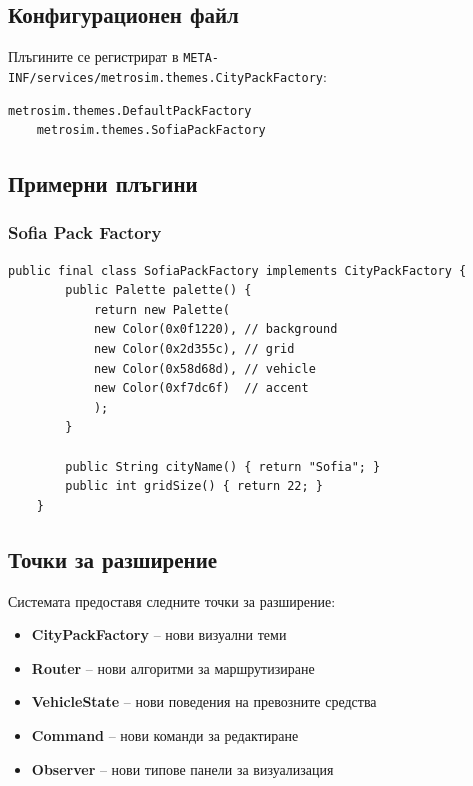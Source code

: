 \documentclass{article}
\begin{document}
\subsection{Конфигурационен файл}

Плъгините се регистрират в \texttt{META-INF/services/metrosim.themes.CityPackFactory}:

\begin{lstlisting}[caption=Регистрация на плъгини]
	metrosim.themes.DefaultPackFactory
	metrosim.themes.SofiaPackFactory
\end{lstlisting}

\subsection{Примерни плъгини}

\subsubsection{Sofia Pack Factory}

\begin{lstlisting}[caption=SofiaPackFactory имплементация]
	public final class SofiaPackFactory implements CityPackFactory {
		public Palette palette() {
			return new Palette(
			new Color(0x0f1220), // background
			new Color(0x2d355c), // grid
			new Color(0x58d68d), // vehicle
			new Color(0xf7dc6f)  // accent
			);
		}
		
		public String cityName() { return "Sofia"; }
		public int gridSize() { return 22; }
	}
\end{lstlisting}

\subsection{Точки за разширение}

Системата предоставя следните точки за разширение:

\begin{itemize}
	\item \textbf{CityPackFactory} – нови визуални теми
	\item \textbf{Router} – нови алгоритми за маршрутизиране
	\item \textbf{VehicleState} – нови поведения на превозните средства
	\item \textbf{Command} – нови команди за редактиране
	\item \textbf{Observer} – нови типове панели за визуализация
\end{itemize}
\end{document}

